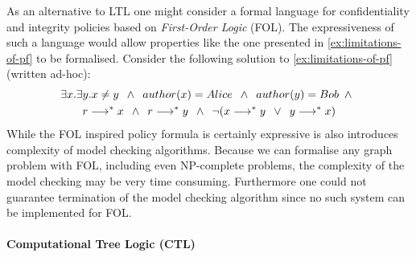 As an alternative to LTL one might consider a formal language for confidentiality and integrity policies based on \emph{First-Order Logic} (FOL). The expressiveness of such a language would allow properties like the one presented in \autoref{ex:limitations-of-pf} to be formalised. Consider the following solution to \autoref{ex:limitations-of-pf} (written ad-hoc):
\begin{gather*}
    \exists x.\exists y. x \neq y \enskip\land\enskip author(x) = Alice \enskip\land\enskip author(y) = Bob \enskip\land\enskip\\ r \longrightarrow^\ast x \enskip\land\enskip r \longrightarrow^\ast y \enskip\land\enskip \lnot(x \longrightarrow^\ast y \enskip\lor\enskip y \longrightarrow^\ast x) 
\end{gather*}
While the FOL inspired policy formula is certainly expressive is also introduces complexity of model checking algorithms. Because we can formalise any graph problem with FOL, including even NP-complete problems, the complexity of the model checking may be very time consuming. Furthermore one could not guarantee termination of the model checking algorithm since no such system can be implemented for FOL\cite{church1936note}.

\paragraph{Computational Tree Logic (CTL)}